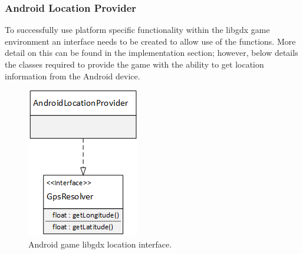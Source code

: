 \subsubsection{Android Location Provider}
To successfully use platform specific functionality within the libgdx game environment an interface needs to be created to allow use of the functions. More detail on this can be found in the implementation section; however, below details the classes required to provide the game with the ability to get location information from the Android device.

\begin{figure}[h!]
\centering\includegraphics{design/figures/ag-lp-cd.png}
\caption{Android game libgdx location interface.}
\end{figure}

